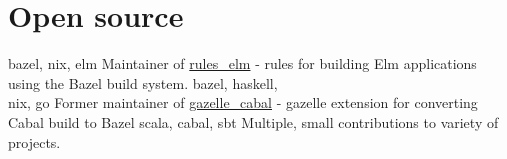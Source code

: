 \section{Open source}
      {bazel, nix, elm}
      {Maintainer of \href{https://github.com/kczulko/rules\_elm}{rules\_elm} - rules for building Elm applications using the Bazel build system.
      }
      {bazel, haskell,\\nix, go}
      {Former maintainer of \href{https://github.com/tweag/gazelle\_cabal}{gazelle\_cabal} - gazelle extension for converting Cabal build to Bazel
      }
      {scala, cabal, sbt}
      {Multiple, small contributions to variety of projects.
      }
